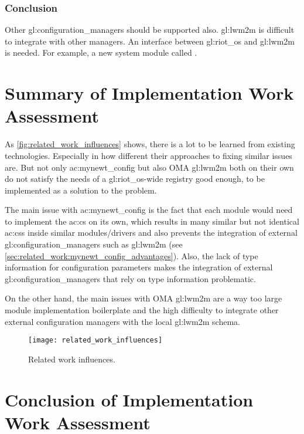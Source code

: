 \subsubsection{Conclusion}

Other \glspl{gl:configuration_manager} should be supported also. \gls{gl:lwm2m} is difficult to integrate with other managers.
An interface between \gls{gl:riot_os} and \gls{gl:lwm2m} is needed. For example, a new system module called .

\section{Summary of Implementation Work Assessment}
\label{sec:related_work:summary}

As \autoref{fig:related_work_influences} shows, there is a lot to be learned from existing technologies.
Especially in how different their approaches to fixing similar issues are.
But not only \gls{ac:mynewt_config} but also OMA \gls{gl:lwm2m} both on their own do not satisfy the needs of a \gls{gl:riot_os}-wide registry good enough, to be implemented as a solution to the problem.

The main issue with \gls{ac:mynewt_config} is the fact that each module would need to implement the \gls{ac:cs} on its own, which results in many similar but not identical \glspl{ac:cs} inside similar modules/drivers and also prevents the integration of external \glspl{gl:configuration_manager} such as \gls{gl:lwm2m} (see \autoref{sec:related_work:mynewt_config_advantages}).
Also, the lack of type information for configuration parameters makes the integration of external \glspl{gl:configuration_manager} that rely on type information problematic.

On the other hand, the main issues with OMA \gls{gl:lwm2m} are a way too large module implementation boilerplate and the high difficulty to integrate other external configuration managers with the local \gls{gl:lwm2m} schema.

\begin{figure}[H]
      \centering
      \texttt{[image: related\_work\_influences]}
      \caption{Related work influences.}
      \label{fig:related_work_influences}
\end{figure}

\section{Conclusion of Implementation Work Assessment}
\label{sec:related_work:conclusion}

